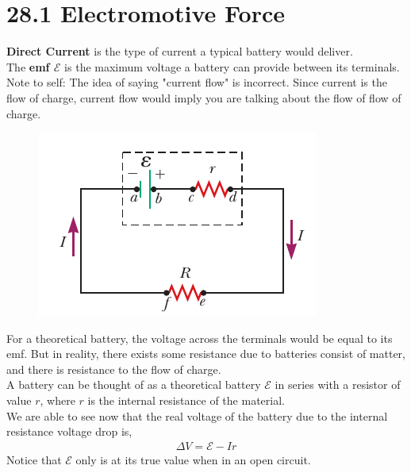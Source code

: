 \documentclass[12pt, titlepage, oneside]{article}
\begin{document}
\section*{28.1 Electromotive Force}

\textbf{Direct Current} is the type of current a typical battery would deliver.\\

The \textbf{emf $\mathscr{E}$} is the maximum voltage a battery can provide between its terminals.
\\

Note to self: The idea of saying "current flow" is incorrect. Since current is the flow of charge, current flow would imply you are talking about the flow of flow of charge.
\\

\begin{figure}
	\begin{center}
		\vspace{-1.5cm}
		\includegraphics[scale=0.5]{1.png}
	\end{center}
\end{figure}
For a theoretical battery, the voltage across the terminals would be equal to its emf. But in reality, there exists some resistance due to batteries consist of matter, and there is resistance to the flow of charge.
\\

 A battery can be thought of as a theoretical battery $\mathscr{E}$ in series with a resistor of value $r$, where $r$ is the internal resistance of the material.
 \\
 
 We are able to see now that the real voltage of the battery due to the internal resistance voltage drop is,
 \begin{align*}
 	\Delta V = \mathscr{E} - Ir
 \end{align*}
Notice that $ \mathscr{E} $ only is at its true value when in an open circuit.
\\
\end{document}
